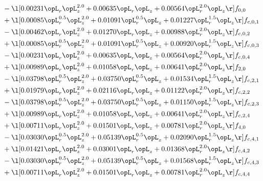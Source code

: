 \begin{alignat}{2}
& - \l[  0.00231 \opL_r \opL_z^{2.0} +  0.00635 \opL_r \opL_z +  0.00564 \opL_r^{2.0} \opL_z  \r] f_{0,0} \nonumber \\ 
& + \l[  0.00085 \opL_r^{0.5} \opL_z^{2.0} +  0.01091 \opL_r^{0.5} \opL_z +  0.01227 \opL_r^{1.5} \opL_z  \r] f_{c,0,1} \nonumber \\ 
& - \l[  0.00462 \opL_r \opL_z^{2.0} +  0.01270 \opL_r \opL_z +  0.00988 \opL_r^{2.0} \opL_z  \r] f_{c,0,2} \nonumber \\ 
& + \l[  0.00085 \opL_r^{0.5} \opL_z^{2.0} +  0.01091 \opL_r^{0.5} \opL_z +  0.00920 \opL_r^{1.5} \opL_z  \r] f_{c,0,3} \nonumber \\ 
& - \l[  0.00231 \opL_r \opL_z^{2.0} +  0.00635 \opL_r \opL_z +  0.00564 \opL_r^{2.0} \opL_z  \r] f_{c,0,4} \nonumber \\ 
& + \l[  0.00989 \opL_r \opL_z^{2.0} +  0.01058 \opL_r \opL_z +  0.00641 \opL_r^{2.0} \opL_z  \r] f_{2,0} \nonumber \\ 
& - \l[  0.03798 \opL_r^{0.5} \opL_z^{2.0} +  0.03750 \opL_r^{0.5} \opL_z +  0.01534 \opL_r^{1.5} \opL_z  \r] f_{c,2,1} \nonumber \\ 
& + \l[  0.01979 \opL_r \opL_z^{2.0} +  0.02116 \opL_r \opL_z +  0.01122 \opL_r^{2.0} \opL_z  \r] f_{c,2,2} \nonumber \\ 
& - \l[  0.03798 \opL_r^{0.5} \opL_z^{2.0} +  0.03750 \opL_r^{0.5} \opL_z +  0.01150 \opL_r^{1.5} \opL_z  \r] f_{c,2,3} \nonumber \\ 
& + \l[  0.00989 \opL_r \opL_z^{2.0} +  0.01058 \opL_r \opL_z +  0.00641 \opL_r^{2.0} \opL_z  \r] f_{c,2,4} \nonumber \\ 
& + \l[  0.00711 \opL_r \opL_z^{2.0} +  0.01501 \opL_r \opL_z +  0.00781 \opL_r^{2.0} \opL_z  \r] f_{4,0} \nonumber \\ 
& - \l[  0.03030 \opL_r^{0.5} \opL_z^{2.0} +  0.05139 \opL_r^{0.5} \opL_z +  0.02090 \opL_r^{1.5} \opL_z  \r] f_{c,4,1} \nonumber \\ 
& + \l[  0.01421 \opL_r \opL_z^{2.0} +  0.03001 \opL_r \opL_z +  0.01368 \opL_r^{2.0} \opL_z  \r] f_{c,4,2} \nonumber \\ 
& - \l[  0.03030 \opL_r^{0.5} \opL_z^{2.0} +  0.05139 \opL_r^{0.5} \opL_z +  0.01568 \opL_r^{1.5} \opL_z  \r] f_{c,4,3} \nonumber \\ 
& + \l[  0.00711 \opL_r \opL_z^{2.0} +  0.01501 \opL_r \opL_z +  0.00781 \opL_r^{2.0} \opL_z  \r] f_{c,4,4} \nonumber \\ 
\end{alignat} 


